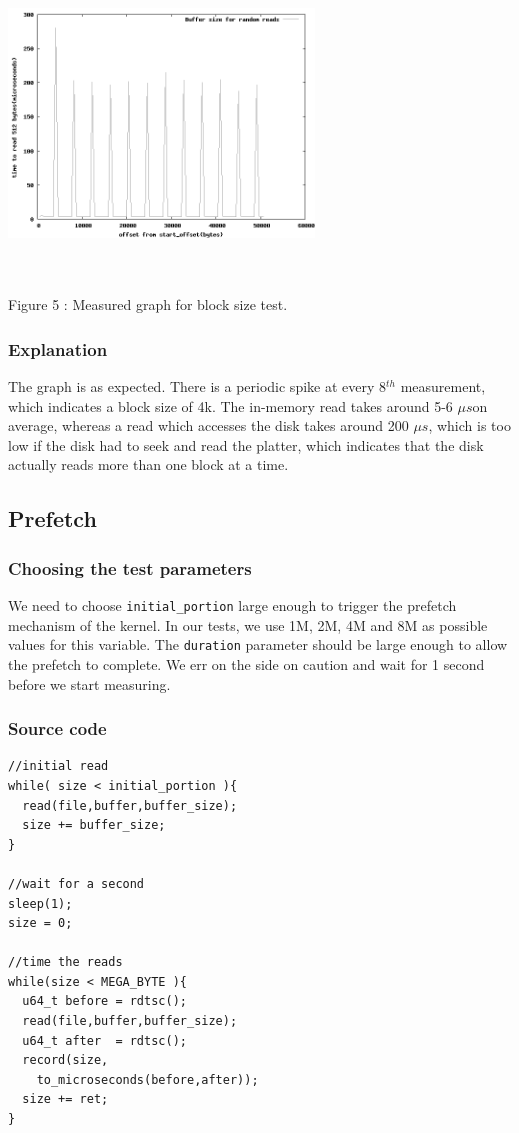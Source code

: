 \documentclass[twocolumn,11pt]{article}
\newcommand{\chumma}[1]{\subsubsection {#1}}
\newcommand{\mus}{$\mu s$}
\begin{document}
\begin{sloppypar}
\includegraphics[width=230pt,height=230pt]{buffer_size.png}
\begin{center}
Figure 5 : Measured graph for block size test.
\end{center}


\chumma{Explanation}
The graph is as expected. There is a periodic spike at every 8$^{th}$
measurement, which indicates a block size of 4k. The in-memory read
takes around 5-6 \mus on average, whereas a read which accesses
the disk takes around 200 \mus, which is too low if the disk
had to seek and read the platter, which indicates that the disk actually
reads more than one block at a time.

\subsection{Prefetch}

\chumma{Choosing the test parameters}
We need to choose {\tt initial\_portion} large enough to trigger the
prefetch mechanism of the kernel. In our tests, we use 1M, 2M, 4M and
8M as possible values for this variable. The {\tt duration} parameter
should be large enough to allow the prefetch to complete. We err on the
side on caution and wait for 1 second before we start measuring.

\chumma{Source code}
\begin{lstlisting}[frame=single]
//initial read
while( size < initial_portion ){
  read(file,buffer,buffer_size);
  size += buffer_size;
}

//wait for a second
sleep(1);
size = 0;

//time the reads
while(size < MEGA_BYTE ){
  u64_t before = rdtsc();
  read(file,buffer,buffer_size);
  u64_t after  = rdtsc();
  record(size,
    to_microseconds(before,after));
  size += ret;
}
\end{lstlisting}


\end{sloppypar}
\end{document}
